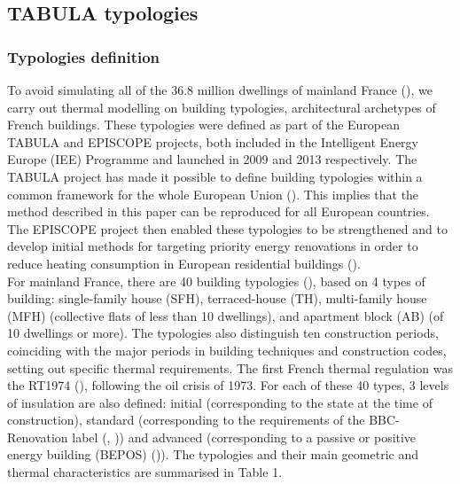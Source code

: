 \documentclass[11pt]{article}
\begin{document}

    \subsection{TABULA typologies} %
    \label{sub:tabula_typologies}
    
        \subsubsection{Typologies definition} %
        \label{ssub:typologies_definition}
        
        To avoid simulating all of the 36.8 million dwellings of mainland France (\cite{insee_378_2023}), we carry out thermal modelling on building typologies, architectural archetypes of French buildings. These typologies were defined as part of the European TABULA and EPISCOPE projects, both included in the Intelligent Energy Europe (IEE) Programme and launched in 2009 and 2013 respectively. The TABULA project has made it possible to define building typologies within a common framework for the whole European Union (\cite{loga_typology_2012}). This implies that the method described in this paper can be reproduced for all European countries. The EPISCOPE project then enabled these typologies to be strengthened and to develop initial methods for targeting priority energy renovations in order to reduce heating consumption in European residential buildings (\cite{loga_tabula_2016}). \\

        For mainland France, there are 40 building typologies (\cite{pouget_consultants_batiments_2015}), based on 4 types of building: single-family house (SFH), terraced-house (TH), multi-family house (MFH) (collective flats of less than 10 dwellings), and apartment block (AB)  (of 10 dwellings or more). The typologies also distinguish ten construction periods, coinciding with the major periods in building techniques and construction codes, setting out specific thermal requirements. The first French thermal regulation was the RT1974 (\cite{jorf_arrete_1974}), following the oil crisis of 1973. For each of these 40 types, 3 levels of insulation are also defined: initial (corresponding to the state at the time of construction), standard (corresponding to the requirements of the BBC-Renovation label (\cite{observatoire_bbc_batiments_2019}, \cite{effinergie_label_2023})) and advanced (corresponding to a passive or positive energy building (BEPOS) (\cite{observatoire_bbc_batiments_2018})). The typologies and their main geometric and thermal characteristics are summarised in Table 1. 
\end{document}
